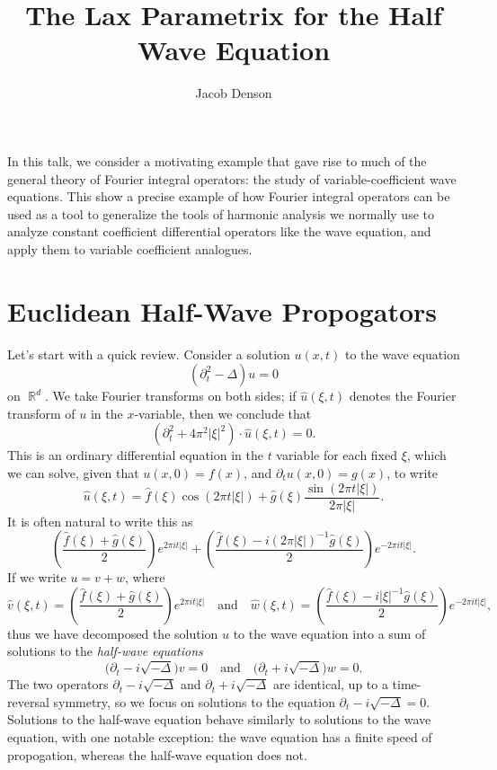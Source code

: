 \documentclass{article}
\title{The Lax Parametrix for the Half Wave Equation}
\author{Jacob Denson}
\theoremstyle{plain}
\theoremstyle{remark}
\theoremstyle{definition}
\DeclareMathOperator{\RR}{\mathbb{R}}
\begin{document}
\maketitle

In this talk, we consider a motivating example that gave rise to much of the general theory of Fourier integral operators: the study of variable-coefficient wave equations. This show a precise example of how Fourier integral operators can be used as a tool to generalize the tools of harmonic analysis we normally use to analyze constant coefficient differential operators like the wave equation, and apply them to variable coefficient analogues.

\section{Euclidean Half-Wave Propogators}

Let's start with a quick review. Consider a solution $u(x,t)$ to the wave equation
%
\[ (\partial_t^2 - \Delta) u = 0 \]
%
on $\RR^d$. We take Fourier transforms on both sides; if $\widehat{u}(\xi,t)$ denotes the Fourier transform of $u$ in the $x$-variable, then we conclude that
%
\[ (\partial_t^2 + 4 \pi^2 |\xi|^2) \cdot \widehat{u}(\xi,t) = 0. \]
%
This is an ordinary differential equation in the $t$ variable for each fixed $\xi$, which we can solve, given that $u(x,0) = f(x)$, and $\partial_t u(x,0) = g(x)$, to write
%
\[ \widehat{u}(\xi,t) = \widehat{f}(\xi) \cos(2 \pi t |\xi|) + \widehat{g}(\xi) \frac{\sin(2 \pi t |\xi|)}{2 \pi |\xi|}. \]
%
It is often natural to write this as
%
\[ \left( \frac{\widehat{f}(\xi) + \widehat{g}(\xi)}{2} \right) e^{2 \pi i t |\xi|} + \left( \frac{\widehat{f}(\xi) - i (2 \pi |\xi|)^{-1} \widehat{g}(\xi)}{2} \right) e^{-2 \pi i t |\xi|}. \]
%
If we write $u = v + w$, where
%
\[ \widehat{v}(\xi,t) = \left( \frac{\widehat{f}(\xi) + \widehat{g}(\xi)}{2} \right) e^{2 \pi i t |\xi|} \quad\text{and}\quad \widehat{w}(\xi,t) = \left( \frac{\widehat{f}(\xi) - i |\xi|^{-1} \widehat{g}(\xi)}{2} \right) e^{-2 \pi i t |\xi|}, \]
%
thus we have decomposed the solution $u$ to the wave equation into a sum of solutions to the \emph{half-wave equations}
%
\[ \Big( \partial_t - i \sqrt{-\Delta} \Big) v = 0 \quad\text{and}\quad \Big(\partial_t + i \sqrt{-\Delta} \Big) w = 0. \]
%
The two operators $\partial_t - i \sqrt{-\Delta}$ and $\partial_t + i \sqrt{-\Delta}$ are identical, up to a time-reversal symmetry, so we focus on solutions to the equation $\partial_t - i \sqrt{-\Delta} = 0$. Solutions to the half-wave equation behave similarly to solutions to the wave equation, with one notable exception: the wave equation has a finite speed of propogation, whereas the half-wave equation does not.
\end{document}
